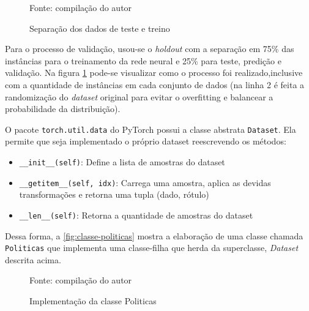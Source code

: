 \begin{figure}[h!]
	\centering
	\caption{Separação dos dados de teste e treino}
	
	\label{fig:separacao-teste-treino}
	{\scriptsize Fonte: compilação do autor}
\end{figure}

Para o processo de validação, usou-se o \textit{holdout} com a separação em 75\% das instâncias para o treinamento da rede neural e 25\% para teste, predição e validação. Na figura \ref{fig:separacao-teste-treino} pode-se visualizar como o processo foi realizado,inclusive com a quantidade de instâncias em cada conjunto de dados (na linha 2 é feita a randomização do \textit{dataset} original para evitar o overfitting e balancear a probabilidade da distribuição).

O pacote \texttt{torch.util.data} do PyTorch possui a classe abstrata \texttt{Dataset}. Ela permite que seja implementado o próprio dataset reescrevendo os métodos: 

\begin{itemize}	
	\item \verb|__init__(self)|: Define a lista de amostras do dataset
	\item \verb|__getitem__(self, idx)|: Carrega uma amostra, aplica as devidas transformações e retorna uma tupla (dado, rótulo)
	\item \verb|__len__(self)|: Retorna a quantidade de amostras do dataset
\end{itemize}

Dessa forma, a \autoref{fig:classe-politicas} mostra a elaboração de uma classe chamada \texttt{Politicas} que implementa uma classe-filha que herda da superclasse, \textit{Dataset} descrita acima.

\begin{figure}[h!]
	\centering
	\caption{Implementação da classe Politicas}
	
	\label{fig:classe-politicas}
	{\scriptsize Fonte: compilação do autor}
\end{figure}


